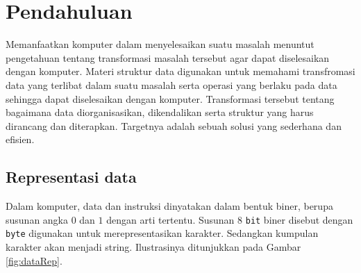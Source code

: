 




\pagestyle{empty} %

\titleGM %
\setcounter{page}{0}
\tableofcontents
\listoffigures
{}
\lstlistoflistings
\addChapter{\kataPengantar}


\chapter{Pendahuluan}
Memanfaatkan komputer dalam menyelesaikan suatu masalah menuntut pengetahuan tentang transformasi masalah tersebut agar dapat diselesaikan dengan komputer. Materi struktur data digunakan untuk memahami transfromasi data yang terlibat dalam suatu masalah serta operasi yang berlaku pada data sehingga dapat diselesaikan dengan komputer. Transformasi tersebut tentang bagaimana data diorganisasikan, dikendalikan serta struktur yang harus dirancang dan diterapkan. Targetnya adalah sebuah solusi yang sederhana dan efisien.

\section{Representasi data}
Dalam komputer, data dan instruksi dinyatakan dalam bentuk biner, berupa susunan angka $0$ dan $1$ dengan arti tertentu. Susunan 8 \texttt{bit} biner disebut dengan \texttt{byte} digunakan untuk merepresentasikan karakter. Sedangkan kumpulan karakter akan menjadi string. Ilustrasinya ditunjukkan pada Gambar \ref{fig:dataRep}.

